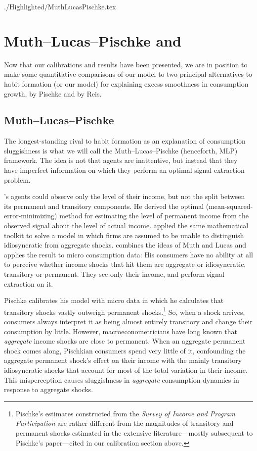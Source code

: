 \hypertarget{MuthLucasPischke}{}
\begin{verbatimwrite}{./Highlighted/MuthLucasPischke.tex}
  \section{Muth--Lucas--Pischke and \cite{reis:inattentive}} \label{sec:Comparisons}

  Now that our calibrations and results have been presented, we are in position to make some quantitative comparisons of our model to two principal alternatives to habit formation (or our model) for explaining excess smoothness in consumption growth, by Pischke and by Reis.

  \subsection{Muth--Lucas--Pischke}
  The longest-standing rival to habit formation as an explanation of consumption sluggishness is what we will call the Muth--Lucas--Pischke (henceforth, MLP) framework.  The idea is not that agents are inattentive, but instead that they have imperfect information on which they perform an optimal signal extraction problem.

  \cite{muthOptimal}'s agents could observe only the level of their income, but not the split between its permanent and transitory components.  He derived the optimal (mean-squared-error-minimizing) method for estimating the level of permanent income from the observed signal about the level of actual income.  \cite{lucas:imperfectInfo} applied the same mathematical toolkit to solve a model in which firms are assumed to be unable to distinguish idiosyncratic from aggregate shocks.  \cite{pischkeMicroMacro} combines the ideas of Muth and Lucas and applies the result to micro consumption data: His consumers have no ability at all to perceive whether income shocks that hit them are aggregate or idiosyncratic, transitory or permanent.  They see only their income, and perform signal extraction on it.

  Pischke calibrates his model with micro data in which he calculates that transitory shocks vastly outweigh permanent shocks.\footnote{Pischke's estimates constructed from the {\it Survey of Income and Program Participation} are rather different from the magnitudes of transitory and permanent shocks estimated in the extensive literature---mostly subsequent to Pischke's paper---cited in our calibration section above.}  So, when a shock arrives, consumers always interpret it as being almost entirely transitory and change their consumption by little.  However, macroeconometricians have long known that {\it aggregate} income shocks are close to permanent.  When an aggregate permanent shock comes along, Pischkian consumers spend very little of it, confounding the aggregate permanent shock's effect on their income with the mainly transitory idiosyncratic shocks that account for most of the total variation in their income.  This misperception causes sluggishness in {\it aggregate} consumption dynamics in response to aggregate shocks.


\end{verbatimwrite}

